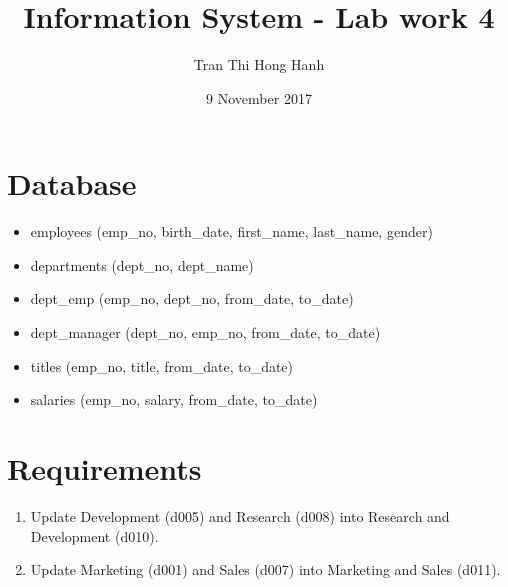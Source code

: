 \documentclass{article}
\title{Information System - Lab work 4}
\author{Tran Thi Hong Hanh}
\date{9 November 2017}
\begin{document}
\maketitle
\section*{Database}
\begin{itemize}
	\item employees (emp\_no, birth\_date, first\_name, last\_name, gender)
	\item departments (dept\_no, dept\_name)
	\item dept\_emp (emp\_no, dept\_no, from\_date, to\_date)
	\item dept\_manager (dept\_no, emp\_no, from\_date, to\_date)
	\item titles (emp\_no, title, from\_date, to\_date)
	\item salaries (emp\_no, salary, from\_date, to\_date)
\end{itemize}

\section*{Requirements}
\begin{enumerate}
	\item Update Development (d005) and Research (d008) into Research and Development (d010).
	\item Update Marketing (d001) and Sales (d007) into Marketing and Sales (d011).	
\end{enumerate}
\end{document}
